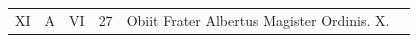 \documentclass[11pt,openany]{book}
\renewcommand{\\}{\par\hspace*{1em}} %
\begin{document}
\begin{center}
\begin{tabular}{l | l | l | r | l l}
\color{Red} XI & \color{Red} A & \color{Red} VI & 27 & Obiit Frater Albertus Magister Ordinis. X. \\



\end{tabular}
\end{center}
\end{document}
